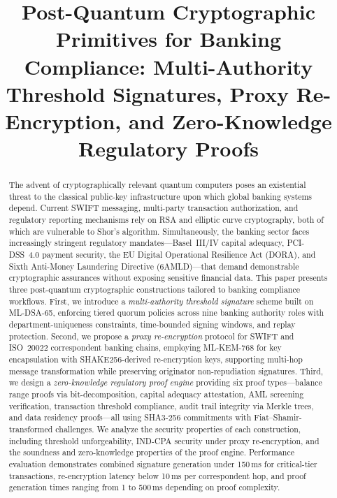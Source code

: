 \documentclass[conference,10pt]{IEEEtran}
\begin{document}
\title{Post-Quantum Cryptographic Primitives for Banking Compliance: Multi-Authority Threshold Signatures, Proxy Re-Encryption, and Zero-Knowledge Regulatory Proofs}

\author{
}

\maketitle

\begin{abstract}
The advent of cryptographically relevant quantum computers poses an existential threat to the classical public-key infrastructure upon which global banking systems depend. Current SWIFT messaging, multi-party transaction authorization, and regulatory reporting mechanisms rely on RSA and elliptic curve cryptography, both of which are vulnerable to Shor's algorithm. Simultaneously, the banking sector faces increasingly stringent regulatory mandates---Basel~III/IV capital adequacy, PCI-DSS~4.0 payment security, the EU Digital Operational Resilience Act (DORA), and Sixth Anti-Money Laundering Directive (6AMLD)---that demand demonstrable cryptographic assurances without exposing sensitive financial data. This paper presents three post-quantum cryptographic constructions tailored to banking compliance workflows. First, we introduce a \emph{multi-authority threshold signature} scheme built on ML-DSA-65, enforcing tiered quorum policies across nine banking authority roles with department-uniqueness constraints, time-bounded signing windows, and replay protection. Second, we propose a \emph{proxy re-encryption} protocol for SWIFT and ISO~20022 correspondent banking chains, employing ML-KEM-768 for key encapsulation with SHAKE256-derived re-encryption keys, supporting multi-hop message transformation while preserving originator non-repudiation signatures. Third, we design a \emph{zero-knowledge regulatory proof engine} providing six proof types---balance range proofs via bit-decomposition, capital adequacy attestation, AML screening verification, transaction threshold compliance, audit trail integrity via Merkle trees, and data residency proofs---all using SHA3-256 commitments with Fiat--Shamir-transformed challenges. We analyze the security properties of each construction, including threshold unforgeability, IND-CPA security under proxy re-encryption, and the soundness and zero-knowledge properties of the proof engine. Performance evaluation demonstrates combined signature generation under 150\,ms for critical-tier transactions, re-encryption latency below 10\,ms per correspondent hop, and proof generation times ranging from 1 to 500\,ms depending on proof complexity.
\end{abstract}
\end{document}
